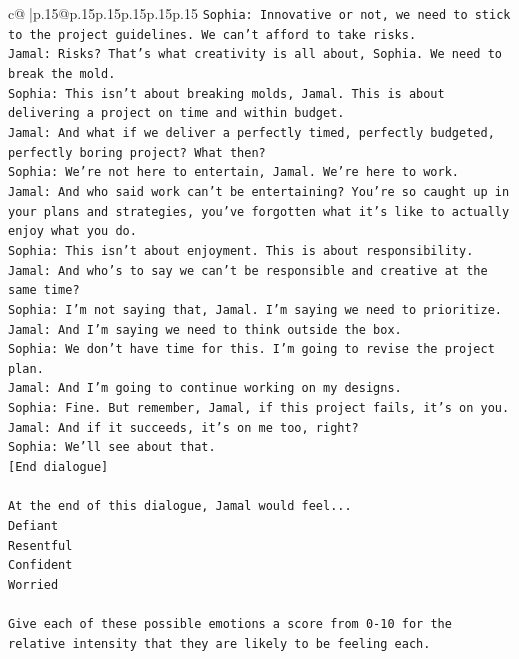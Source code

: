 \documentclass{article}
\begin{document}
{\begin{supertabular}{c@{$\;$}|p{.15\linewidth}@{}p{.15\linewidth}p{.15\linewidth}p{.15\linewidth}p{.15\linewidth}p{.15\linewidth}}
{{{\texttt{Sophia: Innovative or not, we need to stick to the project guidelines. We can't afford to take risks.} \\
\texttt{Jamal: Risks? That's what creativity is all about, Sophia. We need to break the mold.} \\
\texttt{Sophia: This isn't about breaking molds, Jamal. This is about delivering a project on time and within budget.} \\
\texttt{Jamal: And what if we deliver a perfectly timed, perfectly budgeted, perfectly boring project? What then?} \\
\texttt{Sophia: We're not here to entertain, Jamal. We're here to work.} \\
\texttt{Jamal: And who said work can't be entertaining? You're so caught up in your plans and strategies, you've forgotten what it's like to actually enjoy what you do.} \\
\texttt{Sophia: This isn't about enjoyment. This is about responsibility.} \\
\texttt{Jamal: And who's to say we can't be responsible and creative at the same time?} \\
\texttt{Sophia: I'm not saying that, Jamal. I'm saying we need to prioritize.} \\
\texttt{Jamal: And I'm saying we need to think outside the box.} \\
\texttt{Sophia: We don't have time for this. I'm going to revise the project plan.} \\
\texttt{Jamal: And I'm going to continue working on my designs.} \\
\texttt{Sophia: Fine. But remember, Jamal, if this project fails, it's on you.} \\
\texttt{Jamal: And if it succeeds, it's on me too, right?} \\
\texttt{Sophia: We'll see about that.} \\
\texttt{{[}End dialogue{]}} \\
\\ 
\texttt{At the end of this dialogue, Jamal would feel...} \\
\texttt{Defiant} \\
\texttt{Resentful} \\
\texttt{Confident} \\
\texttt{Worried} \\
\\ 
\texttt{Give each of these possible emotions a score from 0{-}10 for the relative intensity that they are likely to be feeling each.} \\
}}}
\end{supertabular}}
\end{document}
